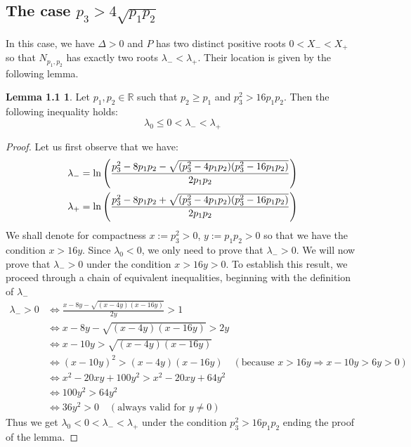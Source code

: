 \documentclass[a4paper, 10pt]{article}
\newcommand{\bea}{\begin{eqnarray}}
\newcommand{\eea}{\end{eqnarray}}
\theoremstyle{definition}
\begin{document}
\subsection{The case $p_3>4\sqrt{p_1p_2}$}
In this case, we have $\Delta>0$ and $P$ has two distinct positive roots $0<X_-<X_+$ so that $N_{p_1,p_2}$ has exactly two roots $\lambda_-<\lambda_+$. Their location is given by the following lemma.

\newtheorem*{manuallemma}{Lemma 1.1}
\begin{manuallemma}
\label{lemma:lambda_ordering}
Let $p_1, p_2 \in \mathbb{R}$ such that $p_2 \geq p_1$ and $p_3^2>16p_1p_2$. Then the following inequality holds:
\[
\lambda_0 \leq 0 <\lambda_- <   \lambda_+
\]
\end{manuallemma}
\begin{proof}Let us first observe that we have:
\bea \lambda_{-}= \ln\left(\frac{p_3^2-8p_1p_2 - \sqrt{(p_3^2-4p_1p_2)(p_3^2-16p_1p_2)}}{2p_1p_2}\right) \cr \lambda_{+} =\ln\left(\frac{p_3^2-8p_1p_2 +  \sqrt{(p_3^2-4p_1p_2)(p_3^2-16p_1p_2)}}{2p_1p_2}\right) \eea
We shall denote for compactness $x := p_3^2>0$, $y := p_1p_2>0$ so that we have the condition $x>16y$. Since $\lambda_0<0$, we only need to prove that $\lambda_->0$. We will now prove that $\lambda_{-} > 0$ under the condition $x > 16y>0$. To establish this result, we proceed through a chain of equivalent inequalities, beginning with the definition of $\lambda_{-}$
\begin{align*}
\lambda_{-} > 0 
&\iff \frac{x - 8y - \sqrt{(x-4y)(x-16y)}}{2y} > 1 \\
&\iff x - 8y - \sqrt{(x-4y)(x-16y)} > 2y \\
&\iff x - 10y > \sqrt{(x-4y)(x-16y)} \\
&\iff (x - 10y)^2 > (x-4y)(x-16y) \quad (\text{because } x > 16y \Rightarrow x-10y > 6y > 0) \\
&\iff x^2 - 20xy + 100y^2 > x^2 - 20xy + 64y^2 \\
&\iff 100y^2 > 64y^2 \\
&\iff 36y^2 > 0 \quad (\text{always valid for  } y \neq 0)
\end{align*}
Thus we get  $\lambda_0 < 0 <\lambda_- <   \lambda_+$ under the condition $p_3^2>16p_1p_2$ ending the proof of the lemma.  
\end{proof}
\end{document}
